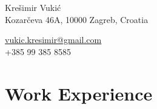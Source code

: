 \documentclass[a4paper,10pt]{article} %
\begin{document}
\pagestyle{empty} %



\begin{minipage}{.5\textwidth}
\LARGE{Krešimir Vukić}\\
\normalsize{Kozarčeva 46A, 10000 Zagreb, Croatia}
\end{minipage}%
\begin{minipage}{.5\textwidth}
\raggedleft
\href{mailto:vukic.kresimir@gmail.com}{vukic.kresimir@gmail.com} \\
+385 99 385 8585 \\
\end{minipage}

\vspace{5mm}



\section{Work Experience}
\end{document}
